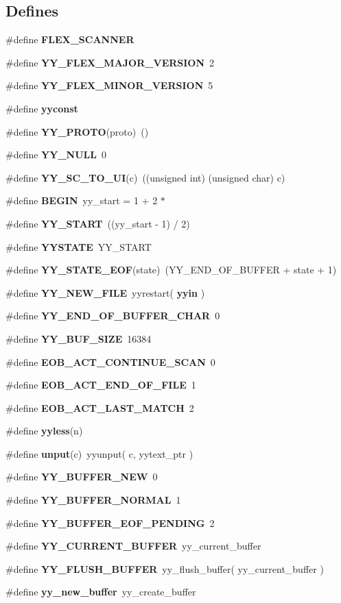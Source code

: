 \subsection*{Defines}
\begin{CompactItemize}
\item 
\#define {\bf FLEX\_\-SCANNER}
\item 
\#define {\bf YY\_\-FLEX\_\-MAJOR\_\-VERSION}\ 2
\item 
\#define {\bf YY\_\-FLEX\_\-MINOR\_\-VERSION}\ 5
\item 
\#define {\bf yyconst}
\item 
\#define {\bf YY\_\-PROTO}(proto)\ ()
\item 
\#define {\bf YY\_\-NULL}\ 0
\item 
\#define {\bf YY\_\-SC\_\-TO\_\-UI}(c)\ ((unsigned int) (unsigned char) c)
\item 
\#define {\bf BEGIN}\ yy\_\-start = 1 + 2 $\ast$
\item 
\#define {\bf YY\_\-START}\ ((yy\_\-start - 1) / 2)
\item 
\#define {\bf YYSTATE}\ YY\_\-START
\item 
\#define {\bf YY\_\-STATE\_\-EOF}(state)\ (YY\_\-END\_\-OF\_\-BUFFER + state + 1)
\item 
\#define {\bf YY\_\-NEW\_\-FILE}\ yyrestart( {\bf yyin} )
\item 
\#define {\bf YY\_\-END\_\-OF\_\-BUFFER\_\-CHAR}\ 0
\item 
\#define {\bf YY\_\-BUF\_\-SIZE}\ 16384
\item 
\#define {\bf EOB\_\-ACT\_\-CONTINUE\_\-SCAN}\ 0
\item 
\#define {\bf EOB\_\-ACT\_\-END\_\-OF\_\-FILE}\ 1
\item 
\#define {\bf EOB\_\-ACT\_\-LAST\_\-MATCH}\ 2
\item 
\#define {\bf yyless}(n)
\item 
\#define {\bf unput}(c)\ yyunput( c, yytext\_\-ptr )
\item 
\#define {\bf YY\_\-BUFFER\_\-NEW}\ 0
\item 
\#define {\bf YY\_\-BUFFER\_\-NORMAL}\ 1
\item 
\#define {\bf YY\_\-BUFFER\_\-EOF\_\-PENDING}\ 2
\item 
\#define {\bf YY\_\-CURRENT\_\-BUFFER}\ yy\_\-current\_\-buffer
\item 
\#define {\bf YY\_\-FLUSH\_\-BUFFER}\ yy\_\-flush\_\-buffer( yy\_\-current\_\-buffer )
\item 
\#define {\bf yy\_\-new\_\-buffer}\ yy\_\-create\_\-buffer

\end{CompactItemize}
